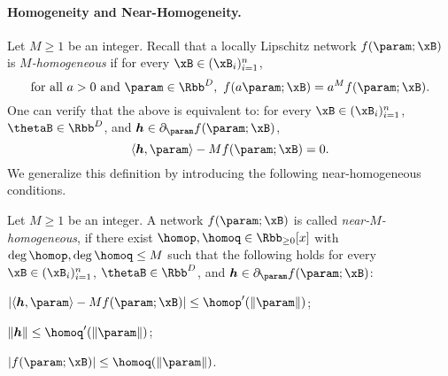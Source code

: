\paragraph{Homogeneity and Near-Homogeneity.} 
Let $M\ge 1$ be an integer. 
Recall that a locally Lipschitz network $f(\param; \xB)$ is \emph{$M$-homogeneous} \citep{lyu2020gradient,ji2020directional} if for every $\xB\in(\xB_i)_{i=1}^n$,
\begin{equation}\label{eq:homogeneous}
\text{for all $a>0$ and $\param\in\Rbb^D$},\ f(a \param; \xB) = a^M f(\param; \xB).
\end{equation}
One can verify that the above is equivalent to:
for every $\xB\in(\xB_i)_{i=1}^n$, $\thetaB\in\Rbb^D$, and $\boldsymbol{h} \in  \partial_{\param} f(\param ;\xB)$,
\begin{equation}
\label{eq:homo-2}
\langle \boldsymbol{h}, \param \rangle - M  f(\param ;\xB) = 0.
\end{equation}
We generalize this definition by introducing the following near-homogeneous conditions. 
\begin{definition}
    \label{def:nearhomo}
Let $M\ge 1$ be an integer. A network $f(\param; \xB)$ is called \emph{near-$M$-homogeneous}, if there exist $\homop, \homoq \in \Rbb_{\ge 0} [x]$ with $\deg \homop, \deg \homoq \le M$ such that the following holds for every $\xB\in(\xB_i)_{i=1}^n$, $\thetaB\in\Rbb^D$, and $\boldsymbol{h} \in  \partial_{\param} f(\param ;\xB)$:
\begin{assumpenum}
\item 
$|\langle \boldsymbol{h}, \param \rangle - M  f(\param ;\xB)| \le \homop^\prime (\|\param\|)$;
    
\item 
$\| \boldsymbol{h} \| \le \homoq^\prime (\|\param\|)$;

\item 
$|f(\param;\xB)| \le \homoq(\|\param\|)$.  
\end{assumpenum}
\end{definition}

